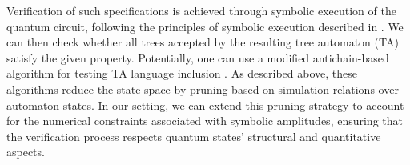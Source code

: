 Verification of such specifications is achieved through symbolic execution of the quantum circuit, following the principles of symbolic execution described in \citep{10.1145/360248.360252}.
%
We can then check whether all trees accepted by the resulting tree automaton (TA) satisfy the given property.
%
Potentially, one can use a modified antichain-based algorithm for testing TA language inclusion \citep{DBLP:conf/tacas/AbdullaCHMV10}.
%
As described above, these algorithms reduce the state space by pruning based on simulation relations over automaton states.
%
In our setting, we can extend this pruning strategy to account for the numerical constraints associated with symbolic amplitudes, ensuring that the verification process respects quantum states' structural and quantitative aspects.
%



